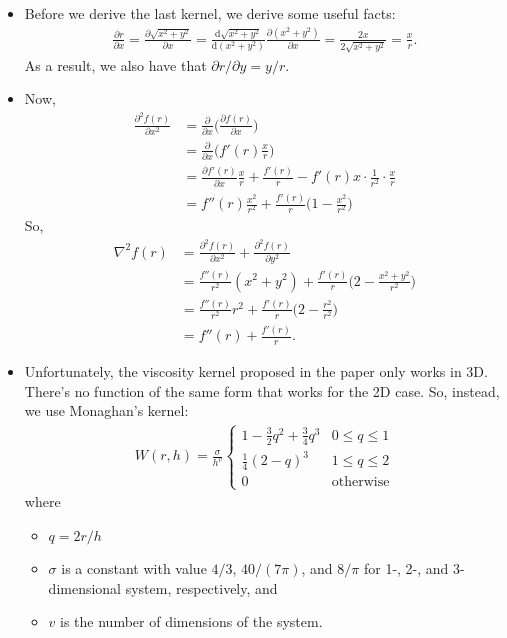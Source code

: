 \documentclass[10pt]{article}
\newcommand{\dee}{\mathrm{d}}
\begin{document}
\begin{itemize}
    \item Before we derive the last kernel, we derive some useful facts:
    \begin{align*}
      \frac{\partial r}{\partial x} 
      = \frac{\partial \sqrt{x^2 + y^2}}{\partial x} 
      = \frac{\dee \sqrt{x^2 + y^2}}{\dee (x^2 + y^2)} \frac{\partial (x^2 + y^2)}{\partial x}
      = \frac{2x}{2\sqrt{x^2 + y^2}}  = \frac{x}{r}.
    \end{align*}
    As a result, we also have that $\partial r / \partial y = y / r$.

    \item Now,
    \begin{align*}
      \frac{\partial^2 f(r)}{\partial x^2} 
      &= \frac{\partial}{\partial x} \bigg( \frac{\partial f(r)}{\partial x} \bigg)\\
      &= \frac{\partial}{\partial x} \bigg( f'(r) \frac{x}{r} \bigg)\\
      &= \frac{\partial f'(r)}{\partial x} \frac{x}{r} + \frac{f'(r)}{r} - f'(r)x \cdot \frac{1}{r^2} \cdot \frac{x}{r}\\
      &= f''(r) \frac{x^2}{r^2} + \frac{f'(r)}{r} \bigg( 1 - \frac{x^2}{r^2} \bigg)
    \end{align*}
    So,
    \begin{align*}
      \nabla^2 f(r) 
      &= \frac{\partial^2 f(r)}{\partial x^2} + \frac{\partial^2 f(r)}{\partial y^2}\\
      &= \frac{f''(r)}{r^2}(x^2 + y^2) + \frac{f'(r)}{r}\bigg( 2 - \frac{x^2 + y^2}{r^2}\bigg)\\
      &= \frac{f''(r)}{r^2} r^2 + \frac{f'(r)}{r}\bigg( 2 - \frac{r^2}{r^2}\bigg)\\
      &= f''(r) + \frac{f'(r)}{r}.
    \end{align*}

    \item Unfortunately, the viscosity kernel proposed in the paper only works in 3D. There's no function of the same form that works for the 2D case. So, instead, we use Monaghan's kernel:
    \begin{align*}
      W(r, h) = \frac{\sigma}{h^v}
      \begin{cases}
        1 - \frac{3}{2}q^2 + \frac{3}{4}q^3 & 0 \leq q \leq 1\\
        \frac{1}{4}(2 - q)^3 & 1 \leq q \leq 2\\
        0 & \mathrm{otherwise}
      \end{cases}      
    \end{align*}
    where
    \begin{itemize}
      \item $q = 2r/h$
      \item $\sigma$ is a constant with value $4/3$, $40/(7\pi)$, and $8/\pi$ for 1-, 2-, and 3-dimensional system, respectively, and
      \item $v$ is the number of dimensions of the system.
    \end{itemize}

  \end{itemize}
\end{document}
